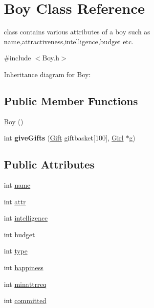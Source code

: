 \hypertarget{classBoy}{}\section{Boy Class Reference}
\label{classBoy}


class contains various attributes of a boy such as name,attractiveness,intelligence,budget etc.  




{\ttfamily \#include $<$Boy.\+h$>$}



Inheritance diagram for Boy\+:
\subsection*{Public Member Functions}
\begin{DoxyCompactItemize}
\item 
\hyperlink{classBoy_abf3fa0c595a477813bf10ca6e665d3d3}{Boy} ()
\item 
int {\bfseries give\+Gifts} (\hyperlink{classGift}{Gift} giftbasket\mbox{[}100\mbox{]}, \hyperlink{classGirl}{Girl} $\ast$g)\hypertarget{classBoy_a1ff4d7ad4e4e17d300ed6b2422af803a}{}\label{classBoy_a1ff4d7ad4e4e17d300ed6b2422af803a}

\end{DoxyCompactItemize}
\subsection*{Public Attributes}
\begin{DoxyCompactItemize}
\item 
int \hyperlink{classBoy_ae4e7057e134fc1ad61aa245220b01e5a}{name}
\item 
int \hyperlink{classBoy_adbc26133f1d3325f5b06b48baf4af077}{attr}
\item 
int \hyperlink{classBoy_a10f24ab1e3dbee6fac2a122c76954fa5}{intelligence}
\item 
int \hyperlink{classBoy_a3b755250e77f892967872c7eb4c26685}{budget}
\item 
int \hyperlink{classBoy_a1b907f52b73e8355ce0dd02db65afa4f}{type}
\item 
int \hyperlink{classBoy_adaf15f15972678dbd77e8b8b319d5767}{happiness}
\item 
int \hyperlink{classBoy_a27a29b1780caee1e017280bc08405662}{minattrreq}
\item 
int \hyperlink{classBoy_ab92b452f9cf9d97fc0c0f8aa6139da46}{committed}
\end{DoxyCompactItemize}


